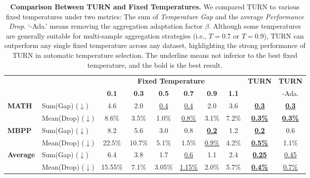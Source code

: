 \begin{table*}[t]
\vspace{-3mm}
\centering
\caption{\textbf{Comparison Between TURN and Fixed Temperatures.} We compared TURN to various fixed temperatures under two metrics: The sum of \emph{Temperature Gap} and the average \emph{Performance Drop}. `-Ada.' means removing the aggregation adaptation factor $\beta$. Although some temperatures are generally suitable for multi-sample aggregation strategies (i.e., $T=0.7$ or $T=0.9$), \textsc{TURN} can outperform any single fixed temperature across any dataset, highlighting the strong performance of TURN in automatic temperature selection. The underline means not inferior to the best fixed temperature, and the bold is the best result.}
\label{tab:temperature_comparison}
\begin{tabular}{l|l|cccccc|c|c}
\toprule
& & \multicolumn{6}{c|}{\textbf{Fixed Temperature}} & \textbf{TURN} & \textbf{TURN}  \\
& & \textbf{0.1} & \textbf{0.3} & \textbf{0.5} & \textbf{0.7} & \textbf{0.9} & \textbf{1.1} &  & -Ada.  \\
\hline
\multirow{2}{*}{\textbf{MATH}} 
  & Sum(Gap) ($\downarrow$) & 4.6 & 2.0 & \underline{0.4} & \underline{0.4} & 2.0 & 3.6 & \underline{\textbf{0.3}} & \underline{\textbf{0.3}} \\
  & Mean(Drop) ($\downarrow$) & 8.6\% & 3.5\% & 1.0\% & \underline{0.8\%} & 3.1\% & 7.2\% & \underline{\textbf{0.3\%}} & \underline{\textbf{0.3\%}}  \\
\hline
\multirow{2}{*}{\textbf{MBPP}}
  & Sum(Gap) ($\downarrow$) & 8.2 & 5.6 & 3.0 & 0.8 & \textbf{\underline{0.2}} & 1.2 & \underline{\textbf{0.2}} & 0.6  \\
  & Mean(Drop) ($\downarrow$) & 22.5\% & 10.7\% & 5.1\% & 1.5\% & \underline{0.9\%} & 4.2\% & \underline{\textbf{0.5\%}} & 1.1\%  \\
\hline
\multirow{2}{*}{\textbf{Average}} 
  & Sum(Gap) ($\downarrow$) & 6.4 & 3.8 & 1.7 & \underline{0.6} & 1.1 & 2.4 & \underline{\textbf{0.25}} & \underline{0.45} \\
  & Mean(Drop) ($\downarrow$) & 15.55\% & 7.1\% & 3.05\% & \underline{1.15\%} & 2.0\% & 5.7\% & \underline{\textbf{0.4\%}} & \underline{0.7\%}\\
\bottomrule
\end{tabular}
\vspace{-4mm}
\end{table*}
